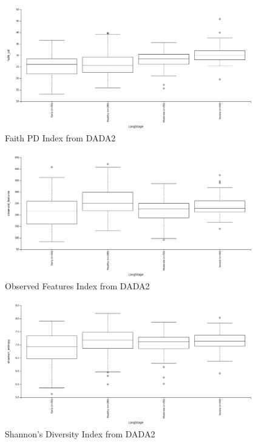 \documentclass[a4paper]{article}
\begin{document}
            \begin{figure}[p]
                \centering
                \includegraphics[width=0.8 \linewidth]{figures/AlphaDiversity/DADA2/faith.png}
                \caption{Faith PD Index from DADA2}
                \label{fig:faith-dada2}
            \end{figure}

            \begin{figure}[p]
                \centering
                \includegraphics[width=0.8 \linewidth]{figures/AlphaDiversity/DADA2/observed.png}
                \caption{Observed Features Index from DADA2}
                \label{fig:observed-dada2}
            \end{figure}

            \begin{figure}[p]
                \centering
                \includegraphics[width=0.8 \linewidth]{figures/AlphaDiversity/DADA2/shannon.png}
                \caption{Shannon's Diversity Index from DADA2}
                \label{fig:shannon-dada2}
            \end{figure}
\end{document}
